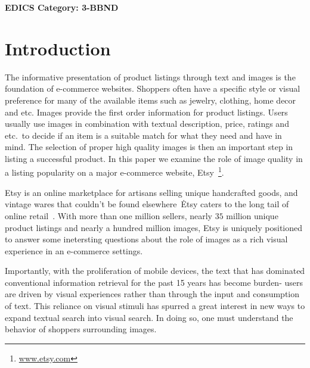 \documentclass[conference,a4paper]{IEEEtran}
\newcommand{\etc}{etc.~}
\begin{document}




\ifCLASSOPTIONpeerreview
 \begin{center} \bfseries EDICS Category: 3-BBND \end{center}
 \fi
%
\IEEEpeerreviewmaketitle



\section{Introduction}
The informative presentation of product listings through text and 
images is the foundation of e-commerce websites. Shoppers often have a 
specific style or visual preference for many of the available items such as jewelry, clothing, home decor and etc. 
Images provide the first order information for product listings. 
Users usually use images in combination with textual description, price, ratings and \etc to decide if an item is a suitable match for what they need and have in mind. The selection of proper high quality images is then an important step in listing a successful product. In this paper we examine the role of image quality in a listing popularity on a major e-commerce website, Etsy~\footnote{\url{www.etsy.com}}.



Etsy is an online marketplace for artisans selling unique handcrafted goods, and vintage wares that
couldn't be found elsewhere~\. Etsy caters to the long tail of online retail~\cite{Anderson:2006,aryafar2014exploring}. With more than one million sellers, nearly $35$ million unique product listings and nearly a hundred million images, Etsy is uniquely positioned to answer some inetersting questions about the role of images as a rich visual experience in an e-commerce settings. 


Importantly, with the proliferation of mobile devices, the text that has dominated conventional information retrieval for the past 15 years has become burden- users are driven by visual experiences rather than through the input and consumption of text. This reliance on visual stimuli has spurred a great interest in new ways to expand textual search into visual search. In doing so, one must understand the behavior of shoppers surrounding images.
 
\end{document}
